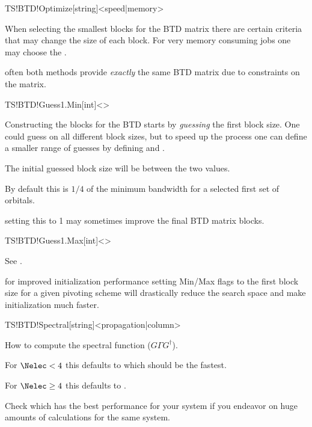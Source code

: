 \begin{fdfentry}{TS!BTD!Optimize}[string]<speed|memory>

  When selecting the smallest blocks for the BTD matrix there are
  certain criteria that may change the size of each block. For very
  memory consuming jobs one may choose the . 

  \note often both methods provide \emph{exactly} the same BTD matrix
  due to constraints on the matrix.
  
\end{fdfentry}

\begin{fdfentry}{TS!BTD!Guess1.Min}[int]<>
  
  Constructing the blocks for the BTD starts by \emph{guessing} the
  first block size. One could guess on all different block sizes, but
  to speed up the process one can define a smaller range of guesses by
  defining  and .

  The initial guessed block size will be between the two values.

  By default this is $1/4$ of the minimum bandwidth for a selected
  first set of orbitals.

  \note setting this to 1 may sometimes improve the final BTD matrix
  blocks.

\end{fdfentry}

\begin{fdfentry}{TS!BTD!Guess1.Max}[int]<>

  See .

  \note for improved initialization performance setting Min/Max flags
  to the first block size for a given pivoting scheme will drastically
  reduce the search space and make initialization much
  faster.

\end{fdfentry}

\begin{fdfentry}{TS!BTD!Spectral}[string]<propagation|column>

  How to compute the spectral function ($G\Gamma G^\dagger$).

  For $\Nelec<4$ this defaults to  which should be the
  fastest.

  For $\Nelec\ge4$ this defaults to .

  Check which has the best performance for your system if you endeavor
  on huge amounts of calculations for the same system.

\end{fdfentry}


